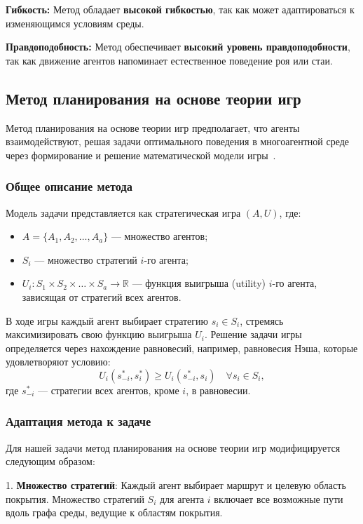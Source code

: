\textbf{Гибкость:}  
Метод обладает \textbf{высокой гибкостью}, так как может адаптироваться к изменяющимся условиям среды.  

\textbf{Правдоподобность:}  
Метод обеспечивает \textbf{высокий уровень правдоподобности}, так как движение агентов напоминает естественное поведение роя или стаи.

\subsection{Метод планирования на основе теории игр}

Метод планирования на основе теории игр предполагает, что агенты взаимодействуют, решая задачи оптимального поведения в многоагентной среде через формирование и решение математической модели игры~\cite{gurevich2005multiagent}.

\subsubsection*{Общее описание метода}
Модель задачи представляется как стратегическая игра $(A, U)$, где:  
\begin{itemize}
	\item $A = \{A_1, A_2, \dots, A_a\}$ — множество агентов;
	\item $S_i$ — множество стратегий $i$-го агента;
	\item $U_i: S_1 \times S_2 \times \dots \times S_a \to \mathbb{R}$ — функция выигрыша (utility) $i$-го агента, зависящая от стратегий всех агентов.
\end{itemize}

В ходе игры каждый агент выбирает стратегию $s_i \in S_i$, стремясь максимизировать свою функцию выигрыша $U_i$.
Решение задачи игры определяется через нахождение равновесий, например, равновесия Нэша, которые удовлетворяют условию:  
\begin{equation}
	U_i(s_{-i}^*, s_i^*) \geq U_i(s_{-i}^*, s_i) \quad \forall s_i \in S_i,
\end{equation}
где $s_{-i}^*$ — стратегии всех агентов, кроме $i$, в равновесии.

\subsubsection*{Адаптация метода к задаче}
Для нашей задачи метод планирования на основе теории игр модифицируется следующим образом:  

1. \textbf{Множество стратегий}:  
Каждый агент выбирает маршрут и целевую область покрытия.
Множество стратегий $S_i$ для агента $i$ включает все возможные пути вдоль графа среды, ведущие к областям покрытия.  

